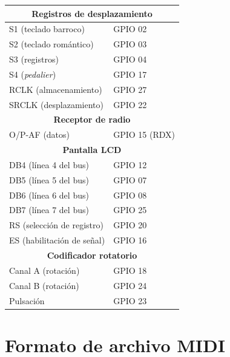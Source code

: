 \begin{center}
	\begin{tabular}{|l|l|}
		\hline \multicolumn{2}{|c|}{\textbf{Registros de desplazamiento}} \\
		\hline S1 (teclado barroco) & \acrshort{GPIO} 02 \\ 
		\hline S2 (teclado romántico) & \acrshort{GPIO} 03 \\ 
		\hline S3 (registros) & \acrshort{GPIO} 04 \\ 
		\hline S4 (\textit{pedalier}) & \acrshort{GPIO} 17 \\ 
		\hline RCLK (almacenamiento) & \acrshort{GPIO} 27 \\ 
		\hline SRCLK (desplazamiento) & \acrshort{GPIO} 22 \\ 
		\hline \multicolumn{2}{|c|}{\textbf{Receptor de radio}} \\
		\hline O/P-AF (datos) & \acrshort{GPIO} 15 (RDX) \\ 
		\hline \multicolumn{2}{|c|}{\textbf{Pantalla \acrshort{LCD}}} \\
		\hline DB4 (línea 4 del bus) & \acrshort{GPIO} 12 \\ 
		\hline DB5 (línea 5 del bus) & \acrshort{GPIO} 07 \\ 
		\hline DB6 (línea 6 del bus) & \acrshort{GPIO} 08 \\ 
		\hline DB7 (línea 7 del bus) & \acrshort{GPIO} 25 \\
		\hline RS (selección de registro) & \acrshort{GPIO} 20 \\ 
		\hline ES (habilitación de señal) & \acrshort{GPIO} 16 \\ 
		\hline \multicolumn{2}{|c|}{\textbf{Codificador rotatorio}} \\
		\hline Canal A (rotación) & \acrshort{GPIO} 18 \\ 
		\hline Canal B (rotación) & \acrshort{GPIO} 24 \\ 
		\hline Pulsación & \acrshort{GPIO} 23 \\ 
		\hline 
	\end{tabular}
	\smallskip
\end{center}

\smallskip

\newpage

\section{Formato de archivo MIDI}
\label{sec:fmto_midi}

